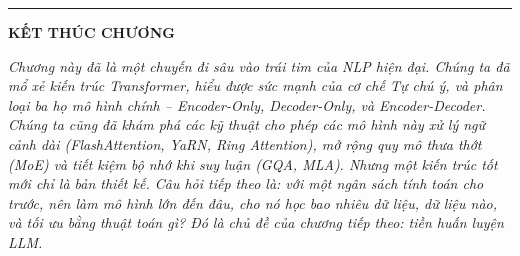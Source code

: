 \bigskip
\hrule
\bigskip

\begin{center}
    \textbf{\Large KẾT THÚC CHƯƠNG \thechapter}
\end{center}

\textit{Chương này đã là một chuyến đi sâu vào trái tim của NLP hiện đại. Chúng ta đã mổ xẻ kiến trúc Transformer, hiểu được sức mạnh của cơ chế Tự chú ý, và phân loại ba họ mô hình chính -- Encoder-Only, Decoder-Only, và Encoder-Decoder. Chúng ta cũng đã khám phá các kỹ thuật cho phép các mô hình này xử lý ngữ cảnh dài (FlashAttention, YaRN, Ring Attention), mở rộng quy mô thưa thớt (MoE) và tiết kiệm bộ nhớ khi suy luận (GQA, MLA). Nhưng một kiến trúc tốt mới chỉ là bản thiết kế. Câu hỏi tiếp theo là: với một ngân sách tính toán cho trước, nên làm mô hình lớn đến đâu, cho nó học bao nhiêu dữ liệu, dữ liệu nào, và tối ưu bằng thuật toán gì? Đó là chủ đề của chương tiếp theo: tiền huấn luyện LLM.}
